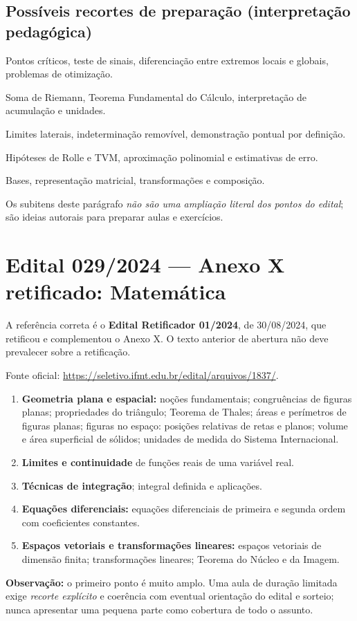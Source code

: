 \documentclass[11pt,a4paper]{article}
\begin{document}
\subsection{Possíveis recortes de preparação (interpretação pedagógica)}
\begin{description}[leftmargin=3.2cm,style=nextline]
\item[Derivadas] Pontos críticos, teste de sinais, diferenciação entre extremos locais e globais, problemas de otimização.
\item[Integral] Soma de Riemann, Teorema Fundamental do Cálculo, interpretação de acumulação e unidades.
\item[Limites] Limites laterais, indeterminação removível, demonstração pontual por definição.
\item[Valor Médio/Taylor] Hipóteses de Rolle e TVM, aproximação polinomial e estimativas de erro.
\item[Álgebra Linear] Bases, representação matricial, transformações e composição.
\end{description}
Os subitens deste parágrafo \emph{não são uma ampliação literal dos pontos do edital}; são ideias autorais para preparar aulas e exercícios.

\section{Edital 029/2024 --- Anexo X \textbf{retificado}: Matemática}
A referência correta é o \textbf{Edital Retificador 01/2024}, de 30/08/2024, que retificou e complementou o Anexo X. O texto anterior de abertura não deve prevalecer sobre a retificação.

Fonte oficial:
\url{https://seletivo.ifmt.edu.br/edital/arquivos/1837/}.
\begin{enumerate}
\item \textbf{Geometria plana e espacial:} noções fundamentais; congruências de figuras planas; propriedades do triângulo; Teorema de Thales; áreas e perímetros de figuras planas; figuras no espaço: posições relativas de retas e planos; volume e área superficial de sólidos; unidades de medida do Sistema Internacional.
\item \textbf{Limites e continuidade} de funções reais de uma variável real.
\item \textbf{Técnicas de integração}; integral definida e aplicações.
\item \textbf{Equações diferenciais:} equações diferenciais de primeira e segunda ordem com coeficientes constantes.
\item \textbf{Espaços vetoriais e transformações lineares:} espaços vetoriais de dimensão finita; transformações lineares; Teorema do Núcleo e da Imagem.
\end{enumerate}
\textbf{Observação:} o primeiro ponto é muito amplo. Uma aula de duração limitada exige \emph{recorte explícito} e coerência com eventual orientação do edital e sorteio; nunca apresentar uma pequena parte como cobertura de todo o assunto.
\end{document}
